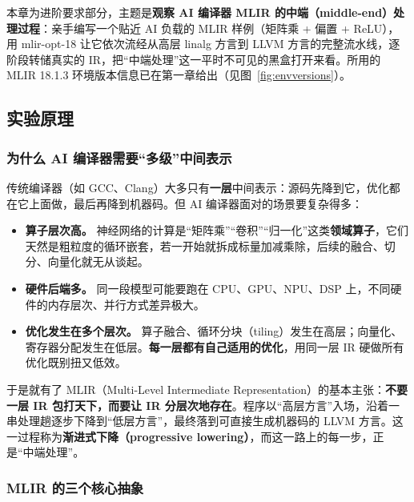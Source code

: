 \documentclass[UTF8,a4paper,10pt]{ctexart}
\begin{document}
本章为进阶要求部分，主题是\textbf{观察 AI 编译器 MLIR 的中端（middle-end）处理过程}：亲手编写一个贴近 AI 负载的 MLIR 样例（矩阵乘 + 偏置 + ReLU），用 mlir-opt-18 让它依次流经从高层 linalg 方言到 LLVM 方言的完整流水线，逐阶段转储真实的 IR，把“中端处理”这一平时不可见的黑盒打开来看。所用的 MLIR 18.1.3 环境版本信息已在第一章给出（见图~\ref{fig:envversions}）。

\subsection{实验原理}

\subsubsection{为什么 AI 编译器需要“多级”中间表示}

传统编译器（如 GCC、Clang）大多只有\textbf{一层}中间表示：源码先降到它，优化都在它上面做，最后再降到机器码。但 AI 编译器面对的场景要复杂得多：

\begin{itemize}
  \item \textbf{算子层次高。} 神经网络的计算是“矩阵乘”“卷积”“归一化”这类\textbf{领域算子}，它们天然是粗粒度的循环嵌套，若一开始就拆成标量加减乘除，后续的融合、切分、向量化就无从谈起。
  \item \textbf{硬件后端多。} 同一段模型可能要跑在 CPU、GPU、NPU、DSP 上，不同硬件的内存层次、并行方式差异极大。
  \item \textbf{优化发生在多个层次。} 算子融合、循环分块（tiling）发生在高层；向量化、寄存器分配发生在低层。\textbf{每一层都有自己适用的优化}，用同一层 IR 硬做所有优化既别扭又低效。
\end{itemize}

于是就有了 MLIR（Multi-Level Intermediate Representation）的基本主张：\textbf{不要一层 IR 包打天下，而要让 IR 分层次地存在}。程序以“高层方言”入场，沿着一串处理趟逐步下降到“低层方言”，最终落到可直接生成机器码的 LLVM 方言。这一过程称为\textbf{渐进式下降（progressive lowering）}，而这一路上的每一步，正是“中端处理”。

\subsubsection{MLIR 的三个核心抽象}
\end{document}
